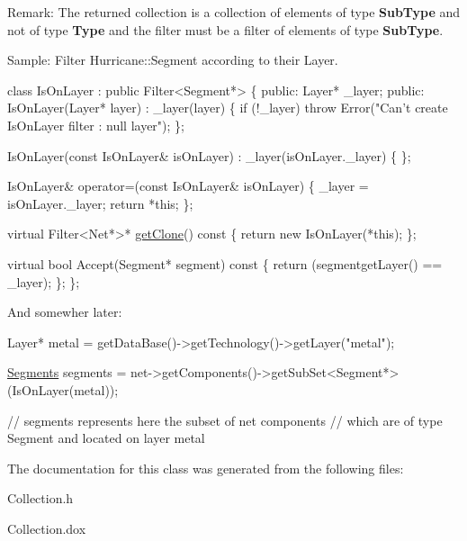 \begin{DoxyParagraph}{Remark\+: The returned collection is a collection of elements of type }
{\bfseries Sub\+Type} and not of type {\bfseries Type} and the filter must be a filter of elements of type {\bfseries Sub\+Type}.
\end{DoxyParagraph}
\begin{DoxyParagraph}{Sample\+: Filter Hurricane\+:\+:Segment according to their Layer.}

\begin{DoxyCode}
\textcolor{keyword}{class }IsOnLayer : \textcolor{keyword}{public} Filter<Segment*> \{
   \textcolor{keyword}{public}:
      Layer* \_layer;
   \textcolor{keyword}{public}:
      IsOnLayer(Layer* layer)
        : \_layer(layer)
      \{
         \textcolor{keywordflow}{if} (!\_layer) \textcolor{keywordflow}{throw} Error(\textcolor{stringliteral}{"Can't create IsOnLayer filter : null layer"});
      \};
 
      IsOnLayer(\textcolor{keyword}{const} IsOnLayer& isOnLayer)
        : \_layer(isOnLayer.\_layer)
      \{ \};
 
      IsOnLayer& operator=(\textcolor{keyword}{const} IsOnLayer& isOnLayer)
      \{
         \_layer = isOnLayer.\_layer;
         \textcolor{keywordflow}{return} *\textcolor{keyword}{this};
      \};
 
      \textcolor{keyword}{virtual} Filter<Net*>* \mbox{\hyperlink{classHurricane_1_1Collection_ac75b91d3952b36e14f21174958523924}{getClone}}()\textcolor{keyword}{ const}
\textcolor{keyword}{      }\{
         \textcolor{keywordflow}{return} \textcolor{keyword}{new} IsOnLayer(*\textcolor{keyword}{this});
      \};
 
      \textcolor{keyword}{virtual} \textcolor{keywordtype}{bool} Accept(Segment* segment)\textcolor{keyword}{ const}
\textcolor{keyword}{      }\{
         \textcolor{keywordflow}{return} (segmentgetLayer() == \_layer);
      \};
\};
\end{DoxyCode}

\end{DoxyParagraph}
And somewher later\+: 
\begin{DoxyCode}
Layer* metal = getDataBase()->getTechnology()->getLayer(\textcolor{stringliteral}{"metal"});
 
\mbox{\hyperlink{namespaceHurricane_a30748fa53a81cb597d4a13d651238716}{Segments}} segments = net->getComponents()->getSubSet<Segment*>(IsOnLayer(metal));
 
\textcolor{comment}{// segments represents here the subset of net components}
\textcolor{comment}{// which are of type Segment and located on layer metal}
\end{DoxyCode}
 

The documentation for this class was generated from the following files\+:\begin{DoxyCompactItemize}
\item 
Collection.\+h\item 
Collection.\+dox\end{DoxyCompactItemize}
